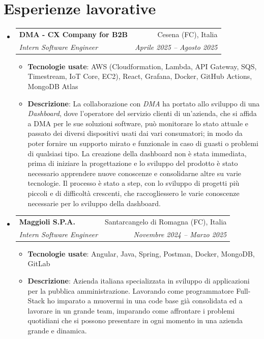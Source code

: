 \documentclass[letterpaper,11pt]{article}
\makeatletter
\newcommand{\resumeItem}[2]{
  \item\small{
    \textbf{#1}{: #2 \vspace{-2pt}}
  }
}
\newcommand{\resumeSubheading}[4]{
  \vspace{-1pt}\item
    \begin{tabular*}{0.97\textwidth}{l@{\extracolsep{\fill}}r}
      \textbf{#1} & #2 \\
      \textit{\small#3} & \textit{\small #4} \\
    \end{tabular*}\vspace{-5pt}
}
\newcommand{\resumeSubHeadingListStart}{\begin{itemize}[leftmargin=*]}
\newcommand{\resumeSubHeadingListEnd}{\end{itemize}}
\newcommand{\resumeItemListStart}{\begin{itemize}}
\newcommand{\resumeItemListEnd}{\end{itemize}\vspace{-5pt}}
\makeatother
\begin{document}
\section{Esperienze lavorative}
\resumeSubHeadingListStart
    \resumeSubheading{DMA - CX Company for B2B}{Cesena (FC), Italia}{Intern Software Engineer}{Aprile 2025 -- Agosto 2025}
    \resumeItemListStart
        \resumeItem{Tecnologie usate} {AWS (Cloudformation, Lambda, API Gateway, SQS, Timestream, IoT Core, EC2), React, Grafana, Docker, GitHub Actions, MongoDB Atlas}
        \resumeItem{Descrizione}
        {La collaborazione con \emph{DMA} ha portato allo sviluppo di una \emph{Dashboard}, dove l’operatore del servizio clienti di un'azienda, che si affida a DMA per le sue soluzioni software, può monitorare lo stato attuale e passato dei diversi dispositivi usati dai vari consumatori; in modo da poter fornire un supporto mirato e funzionale in caso di guasti o problemi di qualsiasi tipo. La creazione della dashboard non è stata immediata, prima di iniziare la progettazione e lo sviluppo del prodotto è stato necessario apprendere nuove conoscenze e consolidarne altre su varie tecnologie. Il processo è stato a step, con lo sviluppo di progetti più piccoli e di difficoltà crescenti, che raccogliessero le varie conoscenze necessarie per lo sviluppo della dashboard.}
    \resumeItemListEnd
    \resumeSubheading{Maggioli S.P.A.}{Santarcangelo di Romagna (FC), Italia}{Intern Software Engineer}{Novembre 2024 -- Marzo 2025}
    \resumeItemListStart
        \resumeItem{Tecnologie usate} {Angular, Java, Spring, Postman, Docker, MongoDB, GitLab}
        \resumeItem{Descrizione}
        {Azienda italiana specializzata in sviluppo di applicazioni per la pubblica amministrazione. Lavorando come programmatore Full-Stack ho imparato a muovermi in una code base già consolidata ed a lavorare in un grande team, imparando come affrontare i problemi quotidiani che si possono presentare in ogni momento in una azienda grande e dinamica.}
    \resumeItemListEnd
\resumeSubHeadingListEnd

\end{document}
